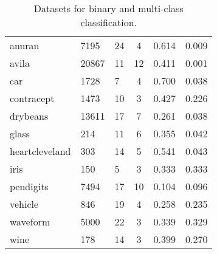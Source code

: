 \begin{table}[ht]
\begin{tabular}{l|llccc}
  anuran & 7195 &   24 &    4 & 0.614 & 0.009 \\ 
  avila & 20867 &   11 &   12 & 0.411 & 0.001 \\ 
  car & 1728 &    7 &    4 & 0.700 & 0.038 \\ 
  contracept & 1473 &   10 &    3 & 0.427 & 0.226 \\ 
  drybeans & 13611 &   17 &    7 & 0.261 & 0.038 \\ 
  glass &  214 &   11 &    6 & 0.355 & 0.042 \\ 
  heartcleveland &  303 &   14 &    5 & 0.541 & 0.043 \\ 
  iris &  150 &    5 &    3 & 0.333 & 0.333 \\ 
  pendigits & 7494 &   17 &   10 & 0.104 & 0.096 \\ 
  vehicle &  846 &   19 &    4 & 0.258 & 0.235 \\ 
  waveform & 5000 &   22 &    3 & 0.339 & 0.329 \\ 
  wine &  178 &   14 &    3 & 0.399 & 0.270 \\ 
   \hline
\end{tabular}
\caption{Datasets for binary and multi-class classification.} 
\label{table:data_info}
\end{table}